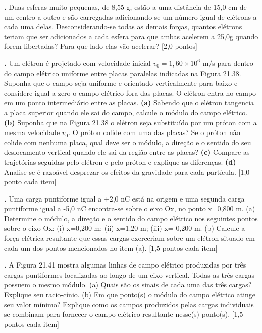 \documentclass[a4paper,10pt]{article}
\newcounter{mine}
\newcommand{\quest}{\ifthenelse{ \equal{\themine}{1} }{
}{
  \vspace{0.5cm}
}  \noindent \textbf{\themine. } \setcounter{mine}{\themine + 1}}
\begin{document}
\begin{multicols*}{2} 
    \setlength{\columnseprule}{0.2pt}
    \setlength{\columnsep}{2cm}
    
    \quest Duas esferas muito pequenas, de 8,55 g, estão a uma distância de 15,0 cm de um centro a outro e são carregadas adicionando-se um número igual de elétrons a cada uma delas. Desconsiderando-se todas as demais forças, quantos elétrons teriam que ser adicionados a cada esfera para que ambas acelerem a 25,0g quando forem libertadas? Para que lado elas vão acelerar? [2,0 pontos]
    
    \quest Um elétron é projetado com velocidade inicial $v_0=1,60×10^6$  m/s para dentro do campo elétrico uniforme entre placas paralelas indicadas na Figura 21.38. Suponha que o campo seja uniforme e orientado verticalmente para baixo e considere igual a zero o campo elétrico fora das placas. O elétron entra no campo em um ponto intermediário entre as placas. \textbf{(a)} Sabendo que o elétron tangencia a placa superior quando ele sai do campo, calcule o módulo do campo elétrico. \textbf{(b)} Suponha que na Figura 21.38 o elétron seja substituído por um próton com a mesma velocidade $v_0$. O próton colide com uma das placas? Se o próton não colide com nenhuma placa, qual deve ser o módulo, a direção e o sentido do seu deslocamento vertical quando ele sai da região entre as placas? \textbf{(c)} Compare as trajetórias seguidas pelo elétron e pelo próton e explique as diferenças. \textbf{(d)} Analise se é razoável desprezar os efeitos da gravidade para cada partícula. [1,0 ponto cada item]
    	
    \quest Uma carga puntiforme igual a +2,0 nC está na origem e uma segunda carga puntiforme igual a -5,0 nC encontra-se sobre o eixo Ox, no ponto x=0,800 m. (a) Determine o módulo, a direção e o sentido do campo elétrico nos seguintes pontos sobre o eixo Ox: (i) x=0,200 m; (ii) x=1,20 m; (iii) x=-0,200 m. (b) Calcule a força elétrica resultante que essas cargas exerceriam sobre um elétron situado em cada um dos pontos mencionados no item (a). [1,5 pontos cada item]
    	
    \quest A Figura 21.41 mostra algumas linhas de campo elétrico produzidas por três cargas puntiformes localizadas ao longo de um eixo vertical. Todas as três cargas possuem o mesmo módulo. (a) Quais são os sinais de cada uma das três cargas? Explique seu racio-cínio. (b) Em que ponto(s) o módulo do campo elétrico atinge seu valor mínimo? Explique como os campos produzidos pelas cargas individuais se combinam para fornecer o campo elétrico resultante nesse(s) ponto(s). [1,5 pontos cada item]
    	

\end{multicols*}
\end{document}
